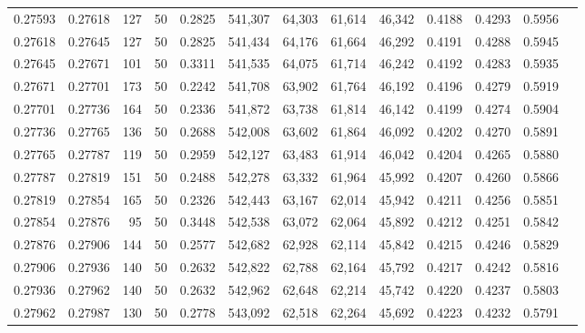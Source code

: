 \begin{tabular}{rrrrrrrrrrrrr}
0.27593 & 0.27618 &   127 &  50 &                                     0.2825 & 541,307 &  64,303 &  61,614 &  46,342 & 0.4188 & 0.4293 & 0.5956 \\
0.27618 & 0.27645 &   127 &  50 &                                     0.2825 & 541,434 &  64,176 &  61,664 &  46,292 & 0.4191 & 0.4288 & 0.5945 \\
0.27645 & 0.27671 &   101 &  50 &                                     0.3311 & 541,535 &  64,075 &  61,714 &  46,242 & 0.4192 & 0.4283 & 0.5935 \\
0.27671 & 0.27701 &   173 &  50 &                                     0.2242 & 541,708 &  63,902 &  61,764 &  46,192 & 0.4196 & 0.4279 & 0.5919 \\
0.27701 & 0.27736 &   164 &  50 &                                     0.2336 & 541,872 &  63,738 &  61,814 &  46,142 & 0.4199 & 0.4274 & 0.5904 \\
0.27736 & 0.27765 &   136 &  50 &                                     0.2688 & 542,008 &  63,602 &  61,864 &  46,092 & 0.4202 & 0.4270 & 0.5891 \\
0.27765 & 0.27787 &   119 &  50 &                                     0.2959 & 542,127 &  63,483 &  61,914 &  46,042 & 0.4204 & 0.4265 & 0.5880 \\
0.27787 & 0.27819 &   151 &  50 &                                     0.2488 & 542,278 &  63,332 &  61,964 &  45,992 & 0.4207 & 0.4260 & 0.5866 \\
0.27819 & 0.27854 &   165 &  50 &                                     0.2326 & 542,443 &  63,167 &  62,014 &  45,942 & 0.4211 & 0.4256 & 0.5851 \\
0.27854 & 0.27876 &    95 &  50 &                                     0.3448 & 542,538 &  63,072 &  62,064 &  45,892 & 0.4212 & 0.4251 & 0.5842 \\
0.27876 & 0.27906 &   144 &  50 &                                     0.2577 & 542,682 &  62,928 &  62,114 &  45,842 & 0.4215 & 0.4246 & 0.5829 \\
0.27906 & 0.27936 &   140 &  50 &                                     0.2632 & 542,822 &  62,788 &  62,164 &  45,792 & 0.4217 & 0.4242 & 0.5816 \\
0.27936 & 0.27962 &   140 &  50 &                                     0.2632 & 542,962 &  62,648 &  62,214 &  45,742 & 0.4220 & 0.4237 & 0.5803 \\
0.27962 & 0.27987 &   130 &  50 &                                     0.2778 & 543,092 &  62,518 &  62,264 &  45,692 & 0.4223 & 0.4232 & 0.5791 \\

\end{tabular}
